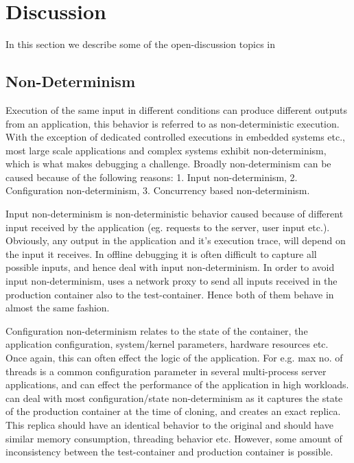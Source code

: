 \section{Discussion}
\label{sec:discussion}

In this section we describe some of the open-discussion topics in \parikshan 

\subsection{Non-Determinism}
\label{sec:nonDeterminism}

Execution of the same input in different conditions can produce different outputs from an application, this behavior is referred to as non-deterministic execution.
With the exception of dedicated controlled executions in embedded systems etc., most large scale applications and complex systems exhibit non-determinism, which is what makes debugging a challenge.
Broadly non-determinism can be caused because of the following reasons: 1. Input non-determinism, 2. Configuration non-determinism, 3. Concurrency based non-determinism.

Input non-determinism is non-deterministic behavior caused because of different input received by the application (eg. requests to the server, user input etc.). 
Obviously, any output in the application and it's execution trace, will depend on the input it receives. 
In offline debugging it is often difficult to capture all possible inputs, and hence deal with input non-determinism.
In order to avoid input non-determinism, \parikshan uses a network proxy to send all inputs received in the production container also to the test-container. 
Hence both of them behave in almost the same fashion.

Configuration non-determinism relates to the state of the container, the application configuration, system/kernel parameters, hardware resources etc.
Once again, this can often effect the logic of the application.
For e.g. max no. of threads is a common configuration parameter in several multi-process server applications, and can effect the performance of the application in high workloads.
\parikshan can deal with most configuration/state non-determinism as it captures the state of the production container at the time of cloning, and creates an exact replica.
This replica should have an identical behavior to the original and should have similar memory consumption, threading behavior etc. 
However, some amount of inconsistency between the test-container and production container is possible.

